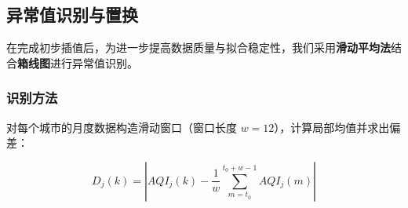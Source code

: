 \documentclass[a4paper,12pt]{article}
\begin{document}
	
	\subsection{异常值识别与置换}
	
	在完成初步插值后，为进一步提高数据质量与拟合稳定性，我们采用\textbf{滑动平均法}结合\textbf{箱线图}进行异常值识别。
	
	\subsubsection{识别方法}
	
	对每个城市的月度数据构造滑动窗口（窗口长度 $w=12$），计算局部均值并求出偏差：
	
	\begin{equation}
		D_j(k) = \left| AQI_j(k) - \frac{1}{w} \sum_{m = t_0}^{t_0 + w - 1} AQI_j(m) \right|
	\end{equation}
	
\end{document}
